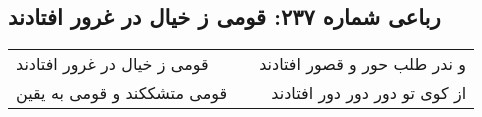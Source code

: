 \begin{center}
\section*{رباعی شماره ۲۳۷: قومی ز خیال در غرور افتادند}
\label{sec:sh237}
\begin{longtable}{l p{0.5cm} r}
قومی ز خیال در غرور افتادند
&&
و ندر طلب حور و قصور افتادند
\\
قومی متشککند و قومی به یقین
&&
از کوی تو دور دور دور افتادند
\\
\end{longtable}
\end{center}
